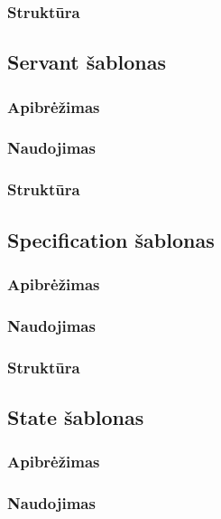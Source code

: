 \documentclass[10pt]{IEEEtran}
\begin{document}
			\subsubsection{Struktūra}

		
		\subsection{Servant šablonas}

			\subsubsection{Apibrėžimas}

			\subsubsection{Naudojimas}

			\subsubsection{Struktūra}

		\subsection{Specification šablonas}

			\subsubsection{Apibrėžimas}

			\subsubsection{Naudojimas}

			\subsubsection{Struktūra}


		\subsection{State šablonas}

			\subsubsection{Apibrėžimas}

			\subsubsection{Naudojimas}
\end{document}
